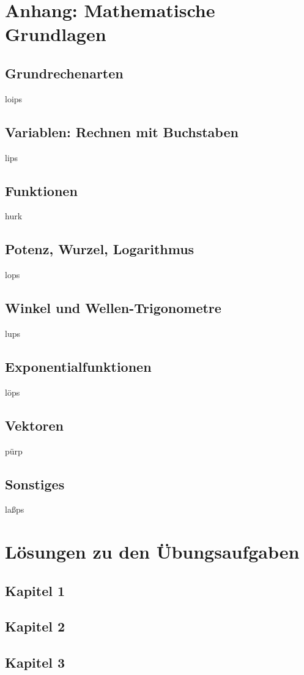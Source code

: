 
\chapter{Anhang: Mathematische Grundlagen}
\label{chapter-mathe}


\section{Grundrechenarten}
loips
\section{Variablen: Rechnen mit Buchstaben}
lips
\section{Funktionen}
hurk
\section{Potenz, Wurzel, Logarithmus}
lops
\section{Winkel und Wellen-Trigonometre}
lups
\section{Exponentialfunktionen}
löps
\section{Vektoren}
pürp
\section{Sonstiges}
laßps
\chapter{Lösungen zu den Übungsaufgaben}
\label{chapter-loesungen}
\section{Kapitel 1}
\section{Kapitel 2}
\section{Kapitel 3}

